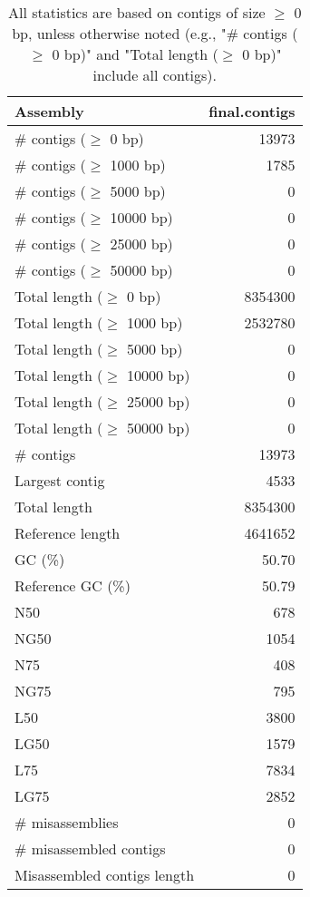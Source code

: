 \documentclass[12pt,a4paper]{article}
\begin{document}
\begin{table}[ht]
\begin{center}
\caption{All statistics are based on contigs of size $\geq$ 0 bp, unless otherwise noted (e.g., "\# contigs ($\geq$ 0 bp)" and "Total length ($\geq$ 0 bp)" include all contigs).}
\begin{tabular}{|l*{1}{|r}|}
\hline
Assembly & final.contigs \\ \hline
\# contigs ($\geq$ 0 bp) & 13973 \\ \hline
\# contigs ($\geq$ 1000 bp) & 1785 \\ \hline
\# contigs ($\geq$ 5000 bp) & 0 \\ \hline
\# contigs ($\geq$ 10000 bp) & 0 \\ \hline
\# contigs ($\geq$ 25000 bp) & 0 \\ \hline
\# contigs ($\geq$ 50000 bp) & 0 \\ \hline
Total length ($\geq$ 0 bp) & 8354300 \\ \hline
Total length ($\geq$ 1000 bp) & 2532780 \\ \hline
Total length ($\geq$ 5000 bp) & 0 \\ \hline
Total length ($\geq$ 10000 bp) & 0 \\ \hline
Total length ($\geq$ 25000 bp) & 0 \\ \hline
Total length ($\geq$ 50000 bp) & 0 \\ \hline
\# contigs & 13973 \\ \hline
Largest contig & 4533 \\ \hline
Total length & 8354300 \\ \hline
Reference length & 4641652 \\ \hline
GC (\%) & 50.70 \\ \hline
Reference GC (\%) & 50.79 \\ \hline
N50 & 678 \\ \hline
NG50 & 1054 \\ \hline
N75 & 408 \\ \hline
NG75 & 795 \\ \hline
L50 & 3800 \\ \hline
LG50 & 1579 \\ \hline
L75 & 7834 \\ \hline
LG75 & 2852 \\ \hline
\# misassemblies & 0 \\ \hline
\# misassembled contigs & 0 \\ \hline
Misassembled contigs length & 0 \\ \hline

\end{tabular}
\end{center}
\end{table}
\end{document}

